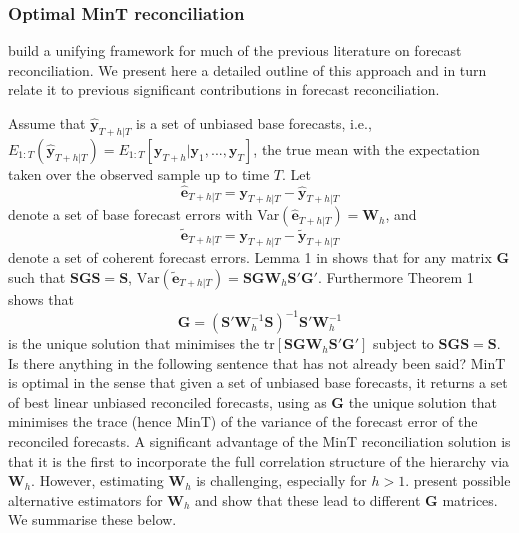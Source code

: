 \documentclass[graybox]{svmult}
\begin{document}
\subsubsection{Optimal MinT reconciliation}

\cite{WicEtAl2019} build a unifying framework for much of the previous literature on forecast reconciliation. We present here a detailed outline of this approach and in turn relate it to previous significant contributions in forecast reconciliation.

Assume that $\hat{\bm{y}}_{T+h|T}$ is a set of unbiased base forecasts, i.e., $E_{1:T}(\hat{\bm{y}}_{T+h|T})= E_{1:T}[\bm{y}_{T+h}|\bm{y}_1,...,\bm{y}_T]$, the true mean with the expectation taken over the observed sample up to time $T$.
Let
\begin{equation}\label{eq:base errors}
\hat{\bm{e}}_{T+h|T} = \bm{y}_{T+h|T}-\hat{\bm{y}}_{T+h|T}
\end{equation}
denote a set of base forecast errors with Var$(\hat{\bm{e}}_{T+h|T})=\bm{W}_h$, and
\begin{equation*}
\tilde{\bm{e}}_{T+h|T} = \bm{y}_{T+h|T}-\tilde{\bm{y}}_{T+h|T}
\end{equation*} denote a set of coherent forecast errors. Lemma 1 in \cite{WicEtAl2019} shows that for any matrix $\bm{G}$ such that $\bm{S}\bm{G}\bm{S}=\bm{S}$, $\text{Var}(\tilde{\bm{e}}_{T+h|T})=\bm{S}\bm{G}\bm{W}_h\bm{S}'\bm{G}'
$. Furthermore Theorem 1 shows that
\begin{equation} \label{eq:MinT}
\bm{G} = (\bm{S}'{\bm{W}}^{-1}_h\bm{S})^{-1}\bm{S}'{\bm{W}}^{-1}_h
\end{equation}
is the unique solution that minimises the tr$[\bm{S}\bm{G}\bm{W}_h\bm{S}'\bm{G}']$ subject to $\bm{S}\bm{G}\bm{S}=\bm{S}$. {\color{red} Is there anything in the following sentence that has not already been said?} MinT is optimal in the sense that given a set of unbiased base forecasts, it returns a set of best linear unbiased reconciled forecasts, using as $\bm{G}$ the unique solution that minimises the trace (hence MinT) of the variance of the forecast error of the reconciled forecasts. 
A significant advantage of the MinT reconciliation solution is that it is the first to incorporate the full correlation structure of the hierarchy via ${\bm{W}}_{h}$. However, estimating ${\bm{W}}_{h}$ is challenging, especially for $h>1$. \citet{WicEtAl2019} present possible alternative estimators for ${\bm{W}}_{h}$ and show that these lead to different $\bm{G}$ matrices. We summarise these below.
\end{document}
